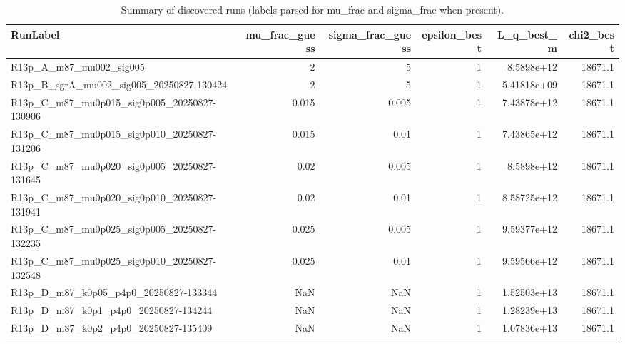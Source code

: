 \begin{table}[t]
\centering
\begin{tabular}{lrrrrr}
\toprule
RunLabel & mu\_frac\_guess & sigma\_frac\_guess & epsilon\_best & L\_q\_best\_m & chi2\_best \\
\midrule
R13p\_A\_m87\_mu002\_sig005 & 2 & 5 & 1 & 8.5898e+12 & 18671.1 \\
R13p\_B\_sgrA\_mu002\_sig005\_20250827-130424 & 2 & 5 & 1 & 5.41818e+09 & 18671.1 \\
R13p\_C\_m87\_mu0p015\_sig0p005\_20250827-130906 & 0.015 & 0.005 & 1 & 7.43878e+12 & 18671.1 \\
R13p\_C\_m87\_mu0p015\_sig0p010\_20250827-131206 & 0.015 & 0.01 & 1 & 7.43865e+12 & 18671.1 \\
R13p\_C\_m87\_mu0p020\_sig0p005\_20250827-131645 & 0.02 & 0.005 & 1 & 8.5898e+12 & 18671.1 \\
R13p\_C\_m87\_mu0p020\_sig0p010\_20250827-131941 & 0.02 & 0.01 & 1 & 8.58725e+12 & 18671.1 \\
R13p\_C\_m87\_mu0p025\_sig0p005\_20250827-132235 & 0.025 & 0.005 & 1 & 9.59377e+12 & 18671.1 \\
R13p\_C\_m87\_mu0p025\_sig0p010\_20250827-132548 & 0.025 & 0.01 & 1 & 9.59566e+12 & 18671.1 \\
R13p\_D\_m87\_k0p05\_p4p0\_20250827-133344 & NaN & NaN & 1 & 1.52503e+13 & 18671.1 \\
R13p\_D\_m87\_k0p1\_p4p0\_20250827-134244 & NaN & NaN & 1 & 1.28239e+13 & 18671.1 \\
R13p\_D\_m87\_k0p2\_p4p0\_20250827-135409 & NaN & NaN & 1 & 1.07836e+13 & 18671.1 \\
\bottomrule
\end{tabular}

\caption{Summary of discovered runs (labels parsed for mu_frac and sigma_frac when present).}
\label{tab:r13p_runs_summary}
\end{table}
